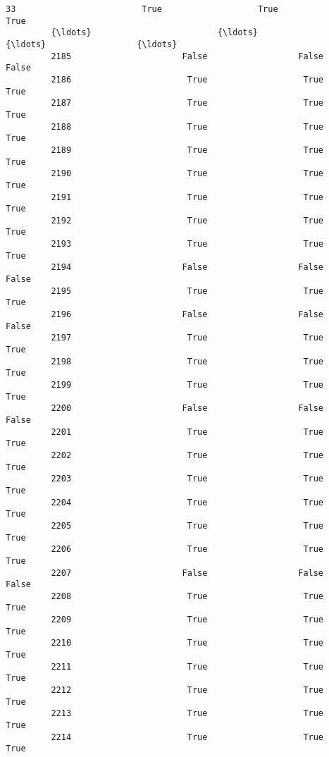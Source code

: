 \documentclass[11pt]{llncs}
\begin{document}
\begin{Verbatim}[commandchars=\\\{\}]
         33                         True                   True                 True   
         {\ldots}                         {\ldots}                    {\ldots}                  {\ldots}   
         2185                      False                  False                False   
         2186                       True                   True                 True   
         2187                       True                   True                 True   
         2188                       True                   True                 True   
         2189                       True                   True                 True   
         2190                       True                   True                 True   
         2191                       True                   True                 True   
         2192                       True                   True                 True   
         2193                       True                   True                 True   
         2194                      False                  False                False   
         2195                       True                   True                 True   
         2196                      False                  False                False   
         2197                       True                   True                 True   
         2198                       True                   True                 True   
         2199                       True                   True                 True   
         2200                      False                  False                False   
         2201                       True                   True                 True   
         2202                       True                   True                 True   
         2203                       True                   True                 True   
         2204                       True                   True                 True   
         2205                       True                   True                 True   
         2206                       True                   True                 True   
         2207                      False                  False                False   
         2208                       True                   True                 True   
         2209                       True                   True                 True   
         2210                       True                   True                 True   
         2211                       True                   True                 True   
         2212                       True                   True                 True   
         2213                       True                   True                 True   
         2214                       True                   True                 True   
         

\end{Verbatim}
\end{document}
